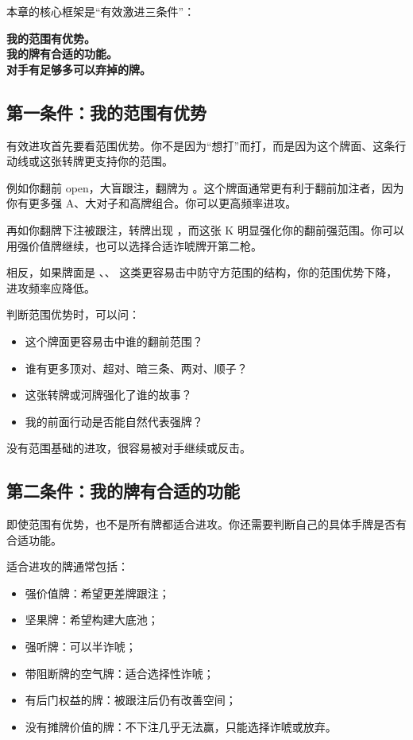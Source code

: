 本章的核心框架是“有效激进三条件”：

\begin{center}
\textbf{我的范围有优势。\\
我的牌有合适的功能。\\
对手有足够多可以弃掉的牌。}
\end{center}

\subsection{第一条件：我的范围有优势}

有效进攻首先要看范围优势。你不是因为“想打”而打，而是因为这个牌面、这条行动线或这张转牌更支持你的范围。

例如你翻前 open，大盲跟注，翻牌为 。这个牌面通常更有利于翻前加注者，因为你有更多强 A、大对子和高牌组合。你可以更高频率进攻。

再如你翻牌下注被跟注，转牌出现 ，而这张 K 明显强化你的翻前强范围。你可以用强价值牌继续，也可以选择合适诈唬牌开第二枪。

相反，如果牌面是 、、 这类更容易击中防守方范围的结构，你的范围优势下降，进攻频率应降低。

判断范围优势时，可以问：

\begin{itemize}
\item 这个牌面更容易击中谁的翻前范围？
\item 谁有更多顶对、超对、暗三条、两对、顺子？
\item 这张转牌或河牌强化了谁的故事？
\item 我的前面行动是否能自然代表强牌？
\end{itemize}

没有范围基础的进攻，很容易被对手继续或反击。

\subsection{第二条件：我的牌有合适的功能}

即使范围有优势，也不是所有牌都适合进攻。你还需要判断自己的具体手牌是否有合适功能。

适合进攻的牌通常包括：

\begin{itemize}
\item 强价值牌：希望更差牌跟注；
\item 坚果牌：希望构建大底池；
\item 强听牌：可以半诈唬；
\item 带阻断牌的空气牌：适合选择性诈唬；
\item 有后门权益的牌：被跟注后仍有改善空间；
\item 没有摊牌价值的牌：不下注几乎无法赢，只能选择诈唬或放弃。
\end{itemize}

